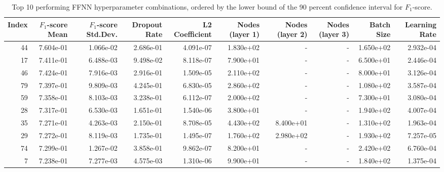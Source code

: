 \begin{table}
\caption{Top 10 performing FFNN hyperparameter combinations, ordered by the lower bound of the 90 percent confidence interval for $F_1$-score.}
\label{tab:05_best_ffnn_hpars}
\begin{adjustbox}{width=1\textwidth}
\begin{tabular}{rrrrrrrrrr}
\toprule
Index & $F_1$-score Mean & $F_1$-score Std.Dev. & Dropout Rate & L2 Coefficient & Nodes (layer 1) & Nodes (layer 2) & Nodes (layer 3) & Batch Size & Learning Rate \\
\midrule
44 & 7.604e-01 & 1.066e-02 & 2.686e-01 & 4.091e-07 & 1.830e+02 & - & - & 1.650e+02 & 2.932e-04 \\
17 & 7.411e-01 & 6.488e-03 & 9.498e-02 & 8.118e-07 & 7.900e+01 & - & - & 6.500e+01 & 2.446e-04 \\
46 & 7.424e-01 & 7.916e-03 & 2.916e-01 & 1.509e-05 & 2.110e+02 & - & - & 8.000e+01 & 3.126e-04 \\
79 & 7.397e-01 & 9.809e-03 & 4.245e-01 & 6.830e-05 & 2.860e+02 & - & - & 1.080e+02 & 3.587e-04 \\
59 & 7.358e-01 & 8.103e-03 & 3.238e-01 & 6.112e-07 & 2.000e+02 & - & - & 7.300e+01 & 3.080e-04 \\
28 & 7.317e-01 & 6.530e-03 & 1.651e-01 & 1.540e-06 & 3.800e+01 & - & - & 1.940e+02 & 4.007e-04 \\
35 & 7.271e-01 & 4.263e-03 & 2.150e-01 & 8.708e-05 & 4.430e+02 & 8.400e+01 & - & 1.310e+02 & 1.963e-04 \\
29 & 7.272e-01 & 8.119e-03 & 1.735e-01 & 1.495e-07 & 1.760e+02 & 2.980e+02 & - & 1.930e+02 & 7.257e-05 \\
74 & 7.299e-01 & 1.267e-02 & 3.858e-01 & 9.862e-07 & 8.200e+01 & - & - & 2.420e+02 & 6.760e-04 \\
7 & 7.238e-01 & 7.277e-03 & 4.575e-03 & 1.310e-06 & 9.900e+01 & - & - & 1.840e+02 & 1.375e-04 \\
\bottomrule
\end{tabular}
\end{adjustbox}
\end{table}
